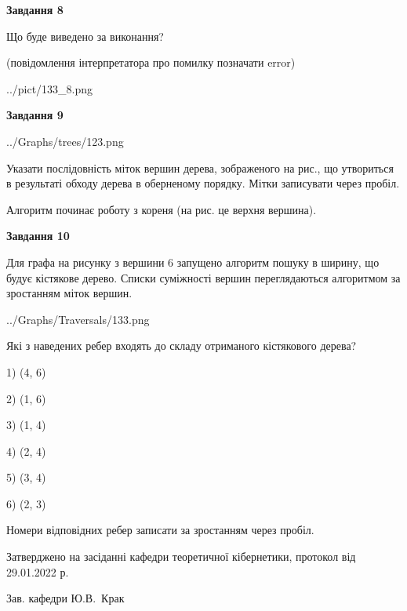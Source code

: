 \documentclass[12pt, ukrainian]{article}
\begin{document}
{\begin {large}
{\begin {center}\textbf{Завдання 8}\end {center}}\par
Що буде виведено за виконання?\par
 (повідомлення інтерпретатора про помилку позначати error)\par
\begin{center}
	{../pict/133_8.png}
\end{center}
\newpage

{\begin {center}\textbf{Завдання 9}\end {center}}\par

\begin{center}
	{../Graphs/trees/123.png}
\end{center}
Указати послідовність міток вершин дерева, зображеного на рис., що утвориться в результаті обходу дерева в оберненому порядку. Мітки записувати через пробіл.\par Алгоритм починає роботу з кореня (на рис. це верхня вершина).\par
\newpage

{\begin {center}\textbf{Завдання 10}\end {center}}\par
Для графа на рисунку з вершини 6 запущено алгоритм пошуку в ширину, що будує кістякове дерево. Списки суміжності вершин переглядаються алгоритмом за зростанням міток вершин.\par
\begin{center}
	{../Graphs/Traversals/133.png}
\end{center}
\par Які з наведених ребер входять до складу отриманого кістякового дерева?\par
1) (4, 6)\par
2) (1, 6)\par
3) (1, 4)\par
4) (2, 4)\par
5) (3, 4)\par
6) (2, 3)\par
{\vskip 15pt} Номери відповідних ребер записати за зростанням через пробіл.\par
\newpage


\end {large}
}
{\smallskip \begin {small} Затверджено на засіданні кафедри теоретичної кібернетики, протокол  від   29.01.2022 р.\par\smallskip\smallskip
{\parbox {6.5 cm}{Зав. кафедри \dotfill Ю.В.~Крак}} \end{small}}
\end{document}
